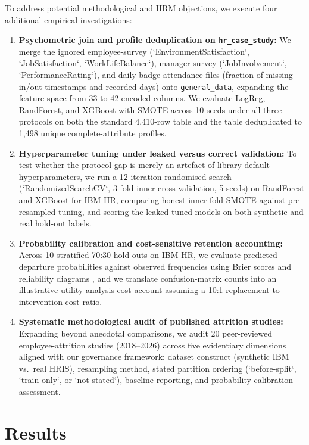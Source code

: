 \documentclass[12pt,a4paper]{article}
\begin{document}
To address potential methodological and HRM objections, we execute four additional empirical investigations:
\begin{enumerate}
\item \textbf{Psychometric join and profile deduplication on \texttt{hr\_case\_study}:} We merge the ignored employee-survey (`EnvironmentSatisfaction`, `JobSatisfaction`, `WorkLifeBalance`), manager-survey (`JobInvolvement`, `PerformanceRating`), and daily badge attendance files (fraction of missing in/out timestamps and recorded days) onto \texttt{general\_data}, expanding the feature space from 33 to 42 encoded columns. We evaluate LogReg, RandForest, and XGBoost with SMOTE across 10 seeds under all three protocols on both the standard 4,410-row table and the table deduplicated to 1,498 unique complete-attribute profiles.
\item \textbf{Hyperparameter tuning under leaked versus correct validation:} To test whether the protocol gap is merely an artefact of library-default hyperparameters, we run a 12-iteration randomised search (`RandomizedSearchCV`, 3-fold inner cross-validation, 5 seeds) on RandForest and XGBoost for IBM HR, comparing honest inner-fold SMOTE against pre-resampled tuning, and scoring the leaked-tuned models on both synthetic and real hold-out labels.
\item \textbf{Probability calibration and cost-sensitive retention accounting:} Across 10 stratified 70:30 hold-outs on IBM HR, we evaluate predicted departure probabilities against observed frequencies using Brier scores \parencite{ref32} and reliability diagrams \parencite{ref31,ref41}, and we translate confusion-matrix counts into an illustrative utility-analysis cost account \parencite{ref20,ref35} assuming a 10:1 replacement-to-intervention cost ratio.
\item \textbf{Systematic methodological audit of published attrition studies:} Expanding beyond anecdotal comparisons, we audit 20 peer-reviewed employee-attrition studies (2018--2026) across five evidentiary dimensions aligned with our governance framework: dataset construct (synthetic IBM vs.\ real HRIS), resampling method, stated partition ordering (`before-split`, `train-only`, or `not stated`), baseline reporting, and probability calibration assessment.
\end{enumerate}

\section{Results}
\end{document}
